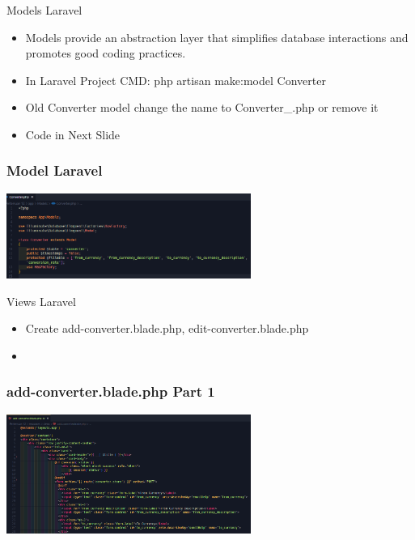 \documentclass[aspectratio=169, table]{beamer}
\begin{document}
\begin{frame}{Models Laravel}
    \vskip1cm
    \begin{itemize}
        \item Models provide an abstraction layer that simplifies database interactions and promotes good coding practices.
        \item In Laravel Project CMD: php artisan make:model Converter
        \item Old Converter model change the name to Converter\_.php or remove it
        \item Code in Next Slide
    \end{itemize}
\end{frame}

\begin{frame}[fragile]
 \frametitle{Model Laravel}
 \vskip1cm
 \begin{center}
  \includegraphics[width=0.6\textwidth]{classFiles/pertemuan-12-model.png}
 \end{center}
\end{frame}

\begin{frame}{Views Laravel}
    \vskip1cm
    \begin{itemize}
        \item Create add-converter.blade.php, edit-converter.blade.php
        \item 
    \end{itemize}
\end{frame}

\begin{frame}[fragile]
 \frametitle{add-converter.blade.php Part 1}
 \vskip1cm
 \begin{center}
  \includegraphics[width=0.6\textwidth]{classFiles/pertemuan-12-view-part-1.png}
 \end{center}
\end{frame}
\end{document}
